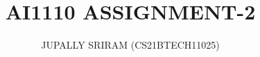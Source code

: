 \documentclass[journal,12pt,twocolumn]{IEEEtran}
\begin{document}
\makeatletter
{}
\makeatother
\let\StandardTheFigure\thefigure
\let\vec\mathbf
\renewcommand{\thefigure}{\theproblem}
\def\putbox#1#2#3{\makebox[0in][l]{\makebox[#1][l]{}\raisebox{\baselineskip}[0in][0in]{\raisebox{#2}[0in][0in]{#3}}}}
     \def\rightbox#1{\makebox[0in][r]{#1}}
     \def\centbox#1{\makebox[0in]{#1}}
     \def\topbox#1{\raisebox{-\baselineskip}[0in][0in]{#1}}
     \def\midbox#1{\raisebox{-0.5\baselineskip}[0in][0in]{#1}}
     
\title{
	AI1110 ASSIGNMENT-2
}
\author{ JUPALLY SRIRAM (CS21BTECH11025)%
}	
%
%
%
% 
%
\end{document}
